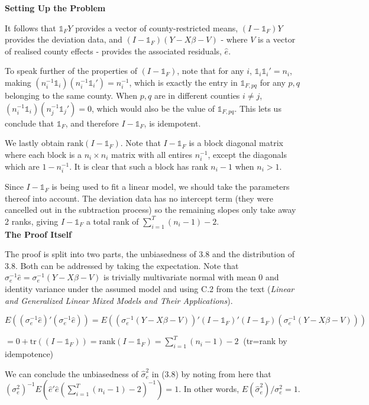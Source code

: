 \documentclass[11pt,letter]{article}
\begin{document}
\textbf{Setting Up the Problem}

It follows that $\mathds{1}_FY$ provides a vector of county-restricted means, $(I-\mathds{1}_F)Y$ provides the deviation data, and $(I-\mathds{1}_F)(Y-X\beta-V)$ - where $V$ is a vector of realised county effects - provides the associated residuals, $\hat e$.

To speak further of the properties of $(I-\mathds{1}_F)$, note that for any $i$, $\mathds{1}_i\mathds{1}_i'=n_i$, making $(n_i^{-1}\mathds{1}_i)(n_i^{-1}\mathds{1}_i')=n_i^{-1}$, which is exactly the entry in $\mathds{1}_{F,pq}$ for any $p,q$ belonging to the same county. When $p,q$ are in different counties $i\neq j$, $(n_i^{-1}\mathds{1}_i)(n_j^{-1}\mathds{1}_j')=0$, which would also be the value of $\mathds{1}_{F,pq}$. This lets us conclude that $\mathds{1}_F$, and therefore $I-\mathds{1}_F$, is idempotent.

We lastly obtain $\text{rank}(I-\mathds{1}_F)$. Note that $I-\mathds{1}_F$ is a block diagonal matrix where each block is a $n_i\times n_i$ matrix with all entires $n_i^{-1}$, except the diagonals which are $1-n_i^{-1}$. It is clear that such a block has rank $n_i-1$ when $n_i>1$.

Since $I-\mathds{1}_F$ is being used to fit a linear model, we should take the parameters thereof into account. The deviation data has no intercept term (they were cancelled out in the subtraction process) so the remaining slopes only take away 2 ranks, giving $I-\mathds{1}_F$ a total rank of $\sum_{i=1}^T (n_i-1)-2$.\\

\textbf{The Proof Itself}

The proof is split into two parts, the unbiasedness of 3.8 and the distribution of 3.8. Both can be addressed by taking the expectation. Note that $\sigma^{-1}_e\hat e=\sigma^{-1}_e(Y-X\beta-V)$ is trivially multivariate normal with mean 0 and identity variance under the assumed model and using C.2 from the text (\textit{Linear and Generalized Linear Mixed Models and Their Applications}).

\hspace{2cm}$E((\sigma^{-1}_e\hat e)'(\sigma^{-1}_e\hat e))=E((\sigma^{-1}_e(Y-X\beta-V))'(I-\mathds{1}_F)'(I-\mathds{1}_F)(\sigma^{-1}_e(Y-X\beta-V)))$

\hspace{3cm}$=0+\text{tr}((I-\mathds{1}_F))=\text{rank}(I-\mathds{1}_F)=\sum_{i=1}^T (n_i-1)-2 \ $ (tr=rank by idempotence)

We can conclude the unbiasedness of $\hat\sigma^2_e$ in (3.8) by noting from here that $(\sigma^2_e)^{-1}E(\hat e'\hat e(\sum_{i=1}^T (n_i-1)-2)^{-1})=1$. In other words, $E(\hat\sigma^2_e)/\sigma^2_e=1$.
\end{document}
